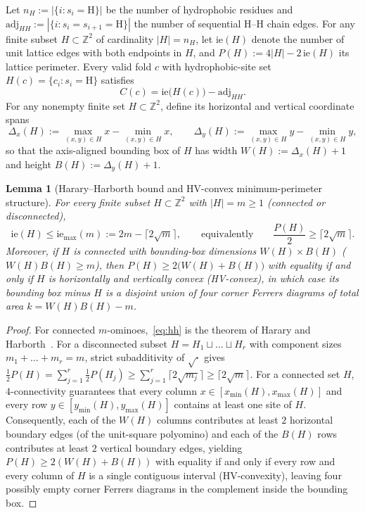 \documentclass[11pt]{article}
\newtheorem{lemma}{Lemma}
\newcommand{\Z}{\mathbb{Z}}
\begin{document}
Let $n_H := |\{i : s_i = \mathrm{H}\}|$ be the number of hydrophobic residues and $\mathrm{adj}_{HH} := |\{i : s_i = s_{i+1} = \mathrm{H}\}|$ the number of sequential H--H chain edges. For any finite subset $H \subset \Z^2$ of cardinality $|H| = n_H$, let $\mathrm{ie}(H)$ denote the number of unit lattice edges with both endpoints in $H$, and $P(H) := 4 |H| - 2\,\mathrm{ie}(H)$ its lattice perimeter. Every valid fold $c$ with hydrophobic-site set $H(c) = \{c_i : s_i = \mathrm{H}\}$ satisfies
\begin{equation}\label{eq:ie_rel}
  C(c) = \mathrm{ie}\bigl(H(c)\bigr) - \mathrm{adj}_{HH}.
\end{equation}
For any nonempty finite set $H \subset \Z^2$, define its horizontal and vertical coordinate spans
\[
  \Delta_x(H) := \max_{(x,y)\in H} x - \min_{(x,y)\in H} x,
  \qquad
  \Delta_y(H) := \max_{(x,y)\in H} y - \min_{(x,y)\in H} y,
\]
so that the axis-aligned bounding box of $H$ has width $W(H) := \Delta_x(H) + 1$ and height $B(H) := \Delta_y(H) + 1$.

\begin{lemma}[Harary--Harborth bound and HV-convex minimum-perimeter structure]\label{lem:hh}
For every finite subset $H \subset \Z^2$ with $|H| = m \ge 1$ (connected or disconnected),
\begin{equation}\label{eq:hh}
  \mathrm{ie}(H) \le \mathrm{ie}_{\max}(m) := 2m - \bigl\lceil 2\sqrt{m} \bigr\rceil,
  \qquad\text{equivalently}\qquad
  \frac{P(H)}{2} \ge \bigl\lceil 2\sqrt{m} \bigr\rceil.
\end{equation}
Moreover, if $H$ is connected with bounding-box dimensions $W(H) \times B(H)$ ($W(H) B(H) \ge m$), then $P(H) \ge 2\bigl(W(H) + B(H)\bigr)$ with equality if and only if $H$ is horizontally and vertically convex (HV-convex), in which case its bounding box minus $H$ is a disjoint union of four corner Ferrers diagrams of total area $k = W(H) B(H) - m$.
\end{lemma}

\begin{proof}
For connected $m$-ominoes,~\eqref{eq:hh} is the theorem of Harary and Harborth~\cite{harary1976}. For a disconnected subset $H = H_1 \sqcup \dots \sqcup H_r$ with component sizes $m_1 + \dots + m_r = m$, strict subadditivity of $\sqrt{\cdot}$ gives $\frac{1}{2}P(H) = \sum_{j=1}^r \frac{1}{2}P(H_j) \ge \sum_{j=1}^r \lceil 2\sqrt{m_j}\rceil \ge \lceil 2\sqrt{m}\rceil$. For a connected set $H$, $4$-connectivity guarantees that every column $x \in [x_{\min}(H), x_{\max}(H)]$ and every row $y \in [y_{\min}(H), y_{\max}(H)]$ contains at least one site of $H$. Consequently, each of the $W(H)$ columns contributes at least $2$ horizontal boundary edges (of the unit-square polyomino) and each of the $B(H)$ rows contributes at least $2$ vertical boundary edges, yielding $P(H) \ge 2(W(H) + B(H))$ with equality if and only if every row and every column of $H$ is a single contiguous interval (HV-convexity), leaving four possibly empty corner Ferrers diagrams in the complement inside the bounding box.
\end{proof}
\end{document}
